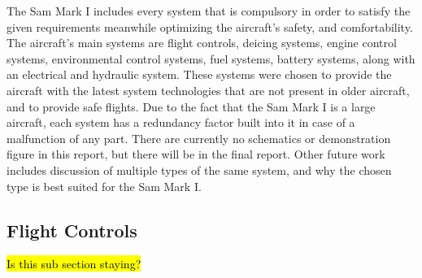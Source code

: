 The Sam Mark I includes every system that is compulsory in order to satisfy the given requirements meanwhile optimizing the aircraft's safety, and comfortability. The aircraft's main systems are flight controls, deicing systems, engine control systems, environmental control systems, fuel systems, battery systems, along with an electrical and hydraulic system. These systems were chosen to provide the aircraft with the latest system technologies that are not present in older aircraft, and to provide safe flights. Due to the fact that the Sam Mark I is a large aircraft, each system has a redundancy factor built into it in case of a malfunction of any part. There are currently no schematics or demonstration figure in this report, but there will be in the final report. Other future work includes discussion of multiple types of the same system, and why the chosen type is best suited for the Sam Mark I. 

\subsection{Flight Controls}
\hl{Is this sub section staying?}
